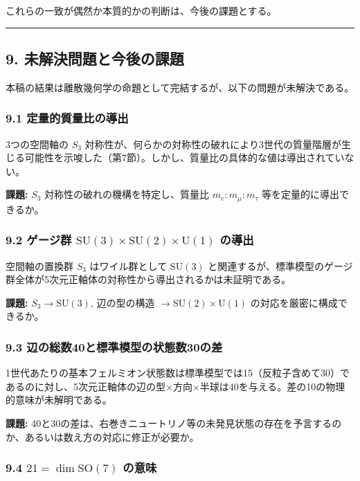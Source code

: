 \documentclass[a4paper,11pt]{ltjsarticle}
\begin{document}
これらの一致が偶然か本質的かの判断は、今後の課題とする。

\begin{center}\rule{0.5\linewidth}{0.5pt}\end{center}

\subsection*{9. 未解決問題と今後の課題}

本稿の結果は離散幾何学の命題として完結するが、以下の問題が未解決である。

\subsubsection*{9.1 定量的質量比の導出}

3つの空間軸の $S_3$
対称性が、何らかの対称性の破れにより3世代の質量階層が生じる可能性を示唆した（第7節）。しかし、質量比の具体的な値は導出されていない。

\textbf{課題:} $S_3$ 対称性の破れの機構を特定し、質量比
$m_e : m_\mu : m_\tau$ 等を定量的に導出できるか。

\subsubsection*{9.2 ゲージ群 $\mathrm{SU}(3) \times \mathrm{SU}(2) \times \mathrm{U}(1)$ の導出}

空間軸の置換群 $S_3$ はワイル群として $\mathrm{SU}(3)$
と関連するが、標準模型のゲージ群全体が5次元正軸体の対称性から導出されるかは未証明である。

\textbf{課題:} $S_3 \to \mathrm{SU}(3)$, 辺の型の構造
$\to \mathrm{SU}(2) \times \mathrm{U}(1)$ の対応を厳密に構成できるか。

\subsubsection*{9.3 辺の総数40と標準模型の状態数30の差}

1世代あたりの基本フェルミオン状態数は標準模型では15（反粒子含めて30）であるのに対し、5次元正軸体の辺の型×方向×半球は40を与える。差の10の物理的意味が未解明である。

\textbf{課題:}
40と30の差は、右巻きニュートリノ等の未発見状態の存在を予言するのか、あるいは数え方の対応に修正が必要か。

\subsubsection*{9.4 $21 = \dim \mathrm{SO}(7)$ の意味}
\end{document}
